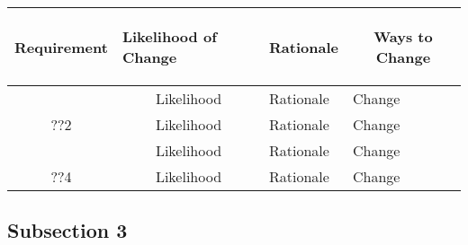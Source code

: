 \documentclass [11pt]{article}
\begin{document}
\begin{longtable}{| p{ } | p{ } |  p{ } | p{ } |}\hline 
\multicolumn{1}{|c|}{\textbf {Requirement}} & 
\begin{minipage}{.14 \columnwidth}\begin{center}\vspace{1.5mm}\textbf{Likelihood of Change}   \vspace{1.5mm} \end{center}\end{minipage}& 
\multicolumn{1}{c|}{\textbf {Rationale}} & \multicolumn{1}{c|}{\textbf {Ways to Change}} \\ \hline

\rowcolor{tableCell} \multicolumn{1}{|c|}{??1}& 
\multicolumn{1}{|c|}{Likelihood} & Rationale & Change \\ \hline

\multicolumn{1}{|c|}{??2}& 
\multicolumn{1}{|c|}{Likelihood} & Rationale & Change \\ \hline

\rowcolor{tableCell} \multicolumn{1}{|c|}{??3}& 
\multicolumn{1}{|c|}{Likelihood} & Rationale & Change \\ \hline

\multicolumn{1}{|c|}{??4}& 
\multicolumn{1}{|c|}{Likelihood} & Rationale & Change \\ \hline
\end{longtable}

\subsection{Subsection 3}
\end{document}
